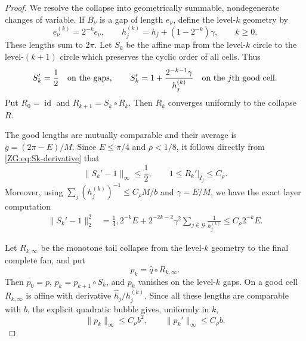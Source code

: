 \documentclass[11pt]{amsart}
\numberwithin{equation}{section}
\theoremstyle{definition}
\theoremstyle{remark}
\begin{document}
\begin{proof}
We resolve the collapse into geometrically summable, nondegenerate
changes of variable.  If $B_\nu$ is a gap of length $e_\nu$, define the
level-$k$ geometry by
\begin{equation}\label{ZG:eq:dyadic-geometry}
 e_\nu^{(k)}=2^{-k}e_\nu,
 \qquad h_j^{(k)}=h_j+(1-2^{-k})\gamma,
 \qquad k\ge0.
\end{equation}
These lengths sum to $2\pi$.  Let $S_k$ be the affine map from the
level-$k$ circle to the level-$(k+1)$ circle which preserves the cyclic
order of all cells.  Thus
\begin{equation}\label{ZG:eq:Sk-derivative}
 S_k'=\frac12\quad\hbox{on the gaps},
 \qquad
 S_k'=1+\frac{2^{-k-1}\gamma}{h_j^{(k)}}
       \quad\hbox{on the $j$th good cell}.
\end{equation}
Put $R_0=\operatorname {id}$ and $R_{k+1}=S_k\circ R_k$.  Then
$R_k$ converges uniformly to the collapse $R$.

The good lengths are mutually comparable and their average is
$g=(2\pi-E)/M$.  Since $E\le\pi/4$ and $\rho<1/8$, it follows directly
from \eqref{ZG:eq:Sk-derivative} that
\begin{equation}\label{ZG:eq:Sk-uniform}
 \|S_k'-1\|_\infty\le\frac12,
 \qquad
 1\le R_k'|_{I_j}\le C_\rho .
\end{equation}
Moreover, using $\sum_j(h_j^{(k)})^{-1}\le C_\rho M/b$ and
$\gamma=E/M$, we have the exact layer computation
\begin{align}
 \|S_k'-1\|_2^2
 &=\frac14,2^{-k}E
   +2^{-2k-2}\gamma^2
       \sum_{j\in\mathcal G}\frac1{h_j^{(k)}}
 \le C_\rho2^{-k}E.                         \label{ZG:eq:Sk-L2}
\end{align}

Let $R_{k,\infty}$ be the monotone tail collapse from the level-$k$
geometry to the final complete fan, and put
\begin{equation}\label{ZG:eq:pk}
 p_k=\widehat q\circ R_{k,\infty}.
\end{equation}
Then $p_0=p$, $p_k=p_{k+1}\circ S_k$, and $p_k$ vanishes on the
level-$k$ gaps.  On a good cell $R_{k,\infty}$ is affine with derivative
$\widehat h_j/h_j^{(k)}$.  Since all these lengths are comparable with
$b$, the explicit quadratic bubble gives, uniformly in $k$,
\begin{equation}\label{ZG:eq:pk-bounds}
 \|p_k\|_\infty\le C_\rho b^2,
 \qquad \|p_k'\|_\infty\le C_\rho b.
\end{equation}


\end{proof}
\end{document}
